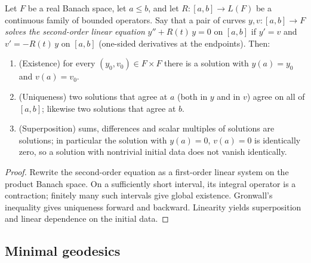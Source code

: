 \begin{lemma}
\label{lem:second-order-linear-ode}




Let $F$ be a real Banach space, let $a\le b$, and let
$R\colon[a,b]\to L(F)$ be a continuous family of bounded operators.
Say that a pair of curves $y,v\colon[a,b]\to F$ {\em solves the
second-order linear equation} $y''+R(t)\,y=0$ on $[a,b]$ if $y'=v$
and $v'=-R(t)\,y$ on $[a,b]$ (one-sided derivatives at the
endpoints). Then:
\begin{enumerate}
\item (Existence) for every $(y_0,v_0)\in F\times F$ there is a
solution with $y(a)=y_0$ and $v(a)=v_0$.
\item (Uniqueness) two solutions that agree at $a$ (both in $y$ and
in $v$) agree on all of $[a,b]$; likewise two solutions that agree
at $b$.
\item (Superposition) sums, differences and scalar multiples of
solutions are solutions; in particular the solution with $y(a)=0$,
$v(a)=0$ is identically zero, so a solution with nontrivial initial
data does not vanish identically.
\end{enumerate}
\end{lemma}

\begin{proof}
\sketch

Rewrite the second-order equation as a first-order linear system on the product Banach space. On a sufficiently short interval, its integral operator is a contraction; finitely many such intervals give global existence. Gronwall's inequality gives uniqueness forward and backward. Linearity yields superposition and linear dependence on the initial data.
\end{proof}

\subsection{Minimal geodesics}


